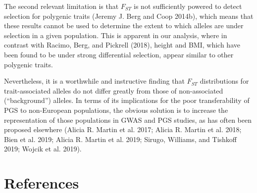 \documentclass[
]{book}
\begin{document}
The second relevant limitation is that \(F_{ST}\) is not sufficiently powered to detect selection for polygenic traits (Jeremy J. Berg and Coop 2014b), which means that these results cannot be used to determine the extent to which alleles are under selection in a given population. This is apparent in our analysis, where in contrast with Racimo, Berg, and Pickrell (2018), height and BMI, which have been found to be under strong differential selection, appear similar to other polygenic traits.

Nevertheless, it is a worthwhile and instructive finding that \(F_{ST}\) distributions for trait-associated alleles do not differ greatly from those of non-associated (``background'') alleles. In terms of its implications for the poor transferability of PGS to non-European populations, the obvious solution is to increase the representation of those populations in GWAS and PGS studies, as has often been proposed elsewhere (Alicia R. Martin et al. 2017; Alicia R. Martin et al. 2018; Bien et al. 2019; Alicia R. Martin et al. 2019; Sirugo, Williams, and Tishkoff 2019; Wojcik et al. 2019).

\hypertarget{references}{%
\chapter*{References}\label{references}}
\end{document}
